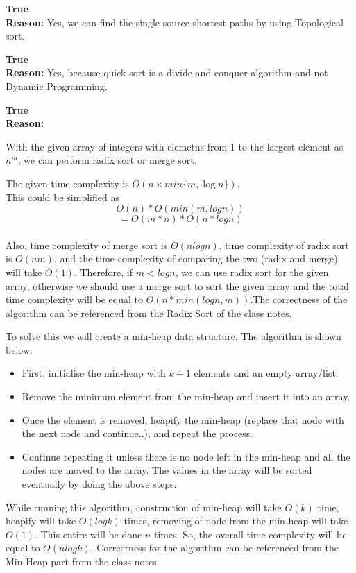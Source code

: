 \documentclass[12pt,twoside]{article}
\begin{document}
\begin{problems}
\begin{problemparts}
\problempart %
\textbf{True}\\
\textbf{Reason: } Yes, we can find the single source shortest paths by using Topological sort.


\problempart %
\textbf{True}\\ 
\textbf{Reason: }Yes, because quick sort is a divide and conquer algorithm and not Dynamic Programming.


\problempart %
\textbf{True}\\
\textbf{Reason: }


\end{problemparts}

\newpage
\problem  %

\begin{problemparts}
\problempart %
With the given array of integers with elemetns from 1 to the largest element as $n^m$, we can perform radix sort or merge sort.

The given time complexity is $O(n \times min\{m, \log n\})$. \\
This could be simplified as \[O(n) * O(min(m, logn))\]
\[= O(m*n) * O(n * logn)\]\\
Also, time complexity of merge sort is $O(nlogn)$, time complexity of radix sort is $O(nm)$, and the time complexity of comparing the two (radix and merge) will take $O(1)$. Therefore, if $m < logn$, we can use radix sort for the given array, otherwise we should use a merge sort to sort the given array and the total time complexity will be equal to $
O(n *min(logn,m))$.The correctness of the algorithm can be referenced from the Radix Sort of the class notes.

\newline

\problempart %
To solve this we will create a min-heap data structure. The algorithm is shown below:
\begin{itemize}
    \item First, initialise the min-heap with $k+1$ elements and an empty array/list.
    \item Remove the minimum element from the min-heap and insert it into an array.
    \item Once the element is removed, heapify the min-heap (replace that node with the next node and continue..), and repeat the process.
    \item Continue repeating it unless there is no node left in the min-heap and all the nodes are moved to the array. The values in the array will be sorted eventually by doing the above steps.
\end{itemize}
While running this algorithm, construction of min-heap will take $O(k)$ time, heapify will take $O(logk)$ times, removing of node from the min-heap will take $O(1)$. This entire will be done $n$ times. So, the overall time complexity will be equal to $O(nlogk)$.
Correctness for the algorithm can be referenced from the Min-Heap part from the class notes.


\end{problemparts}
\end{problems}
\end{document}

